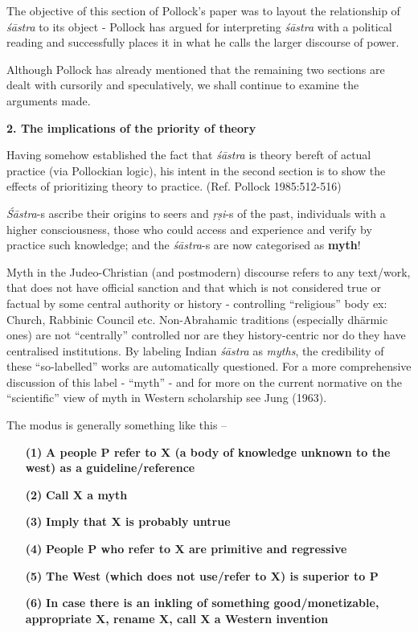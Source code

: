 The objective of this section of Pollock's paper was to layout the relationship of {\sl śāstra} to its object - Pollock has argued for interpreting {\sl śāstra} with a political reading and successfully places it in what he calls the larger discourse of power.

Although Pollock has already mentioned that the remaining two sections are dealt with cursorily and speculatively, we shall continue to examine the arguments made.

{\bf 2. The implications of the priority of theory}

Having somehow established the fact that {\sl śāstra} is theory bereft of actual practice (via Pollockian logic), his intent in the second section is to show the effects of prioritizing theory to practice. (Ref. Pollock 1985:512-516)

{\sl Śāstra}-s ascribe their origins to seers and {\sl ṛṣi}-s of the past, individuals with a higher consciousness, those who could access and experience and verify by practice such knowledge; and the {\sl śāstra}-s are now categorised as {\bf myth}!

Myth in the Judeo-Christian (and postmodern) discourse refers to any text/work, that does not have official sanction and that which is not considered true or factual by some central authority or history - controlling ``religious'' body ex: Church, Rabbinic Council etc. Non-Abrahamic traditions (especially dhārmic ones) are not ``centrally'' controlled nor are they history-centric nor do they have centralised institutions. By labeling Indian {\sl śāstra} as {\sl myths}, the credibility of these ``so-labelled'' works are automatically questioned. For a more comprehensive discussion of this label -  ``myth'' - and for more on the current normative on the ``scientific'' view of myth in Western scholarship see Jung (1963).

The modus is generally something like this --
\begin{itemize}
\item[{\bf(1)}] {\bf A people P refer to X (a body of knowledge unknown to the west) as a guideline/reference}

\item[{\bf(2)}] {\bf Call X  a myth} 

\item[{\bf(3)}] {\bf Imply that X is probably untrue}

\item[{\bf(4)}] {\bf People P who refer to X are primitive and regressive}

\item[{\bf(5)}] {\bf The West (which does not use/refer to X) is superior to P}

\item[{\bf(6)}] {\bf In case there is an inkling of something good/monetizable, appropriate X, rename X, call X a Western invention} 
\end{itemize}

